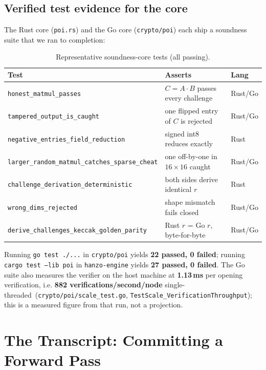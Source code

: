 \documentclass[11pt,a4paper]{article}
\begin{document}
\subsection{Verified test evidence for the core}\label{sec:core-tests}

The Rust core (\texttt{poi.rs}) and the Go core (\texttt{crypto/poi}) each ship a soundness suite that we ran to completion:

\begin{table}[h]
\centering
\begin{tabular}{lll}
\toprule
\textbf{Test} & \textbf{Asserts} & \textbf{Lang} \\
\midrule
\texttt{honest\_matmul\_passes} & $C = A\!\cdot\!B$ passes every challenge & Rust/Go \\
\texttt{tampered\_output\_is\_caught} & one flipped entry of $C$ is rejected & Rust/Go \\
\texttt{negative\_entries\_field\_reduction} & signed int8 reduces exactly & Rust \\
\texttt{larger\_random\_matmul\_catches\_sparse\_cheat} & one off-by-one in $16\!\times\!16$ caught & Rust/Go \\
\texttt{challenge\_derivation\_deterministic} & both sides derive identical $r$ & Rust \\
\texttt{wrong\_dims\_rejected} & shape mismatch fails closed & Rust/Go \\
\texttt{derive\_challenges\_keccak\_golden\_parity} & Rust $r$ = Go $r$, byte-for-byte & Rust/Go \\
\bottomrule
\end{tabular}
\caption{Representative soundness-core tests (all passing).}
\end{table}

Running \texttt{go test ./...} in \texttt{crypto/poi} yields \textbf{22 passed, 0 failed}; running \texttt{cargo test --lib poi} in \texttt{hanzo-engine} yields \textbf{27 passed, 0 failed}. The Go suite also measures the verifier on the host machine at \textbf{1.13\,ms} per opening verification, i.e. \textbf{882 verifications/second/node} single-threaded~(\texttt{crypto/poi/scale\_test.go}, \texttt{TestScale\_VerificationThroughput}); this is a measured figure from that run, not a projection.

\section{The Transcript: Committing a Forward Pass}\label{sec:transcript}
\end{document}
